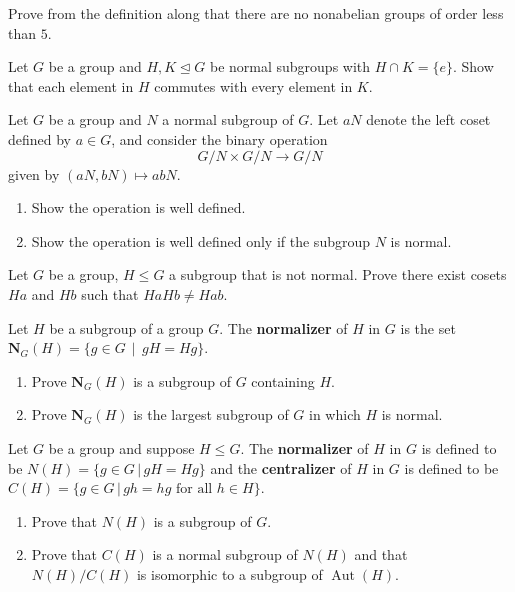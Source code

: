 \documentclass[11pt,twoside,openany]{memoir}
\begin{document}
        \begin{exercise}
        Prove from the definition along that there are no nonabelian groups of order less than $5$.
        \end{exercise}
        
        \begin{exercise}
        Let $G$ be a group and $H,K\mathrel{\unlhd}G$ be normal subgroups with $H\cap K=\{e\}$. Show that each element in $H$ commutes with every element in $K$.
        \end{exercise}
        
        \begin{exercise}
        Let $G$ be a group and $N$ a normal subgroup of $G$. Let $aN$ denote the left coset defined by $a\in G$, and consider the binary operation
        \[
        G/N\times G/N\to G/N
        \]
        given by $(aN, bN)\mapsto abN$.
        \begin{enumerate}[label = (\arabic*)]
            \item Show the operation is well defined.
            \item Show the operation is well defined only if the subgroup $N$ is normal.
        \end{enumerate}
        \end{exercise}
        
        \begin{exercise}
        Let $G$ be a group, $H\le G$ a subgroup that is not normal. Prove there exist cosets $Ha$ and $Hb$ such that $HaHb\neq Hab$.
        \end{exercise}
        
        \begin{exercise}
        Let $H$ be a subgroup of a group $G$. The \textbf{normalizer} of $H$ in $G$ is the set $\mathbf{N}_G(H)=\{g\in G\,\mid\, gH=Hg\}$.
        \begin{enumerate}[label = (\arabic*)]
            \item Prove $\mathbf{N}_G(H)$ is a subgroup of $G$ containing $H$.
            \item Prove $\mathbf{N}_G(H)$ is the largest subgroup of $G$ in which $H$ is normal.
        \end{enumerate}
        \end{exercise}
        
        \begin{exercise}
        Let $G$ be a group and suppose $H\le G$. The \textbf{normalizer} of $H$ in $G$ is defined to be $N(H)=\{g\in G\,|\, gH=Hg\}$ and the \textbf{centralizer} of $H$ in $G$ is defined to be $C(H)=\{g\in G\,|\,  gh=hg\text{ for all }h\in H\}$.
        \begin{enumerate}[label = (\arabic*)]
            \item Prove that $N(H)$ is a subgroup of $G$.
            \item Prove that $C(H)$ is a normal subgroup of $N(H)$ and that $N(H)/C(H)$ is isomorphic to a subgroup of $\operatorname{Aut}(H)$.
        \end{enumerate}
        \end{exercise}
\end{document}
